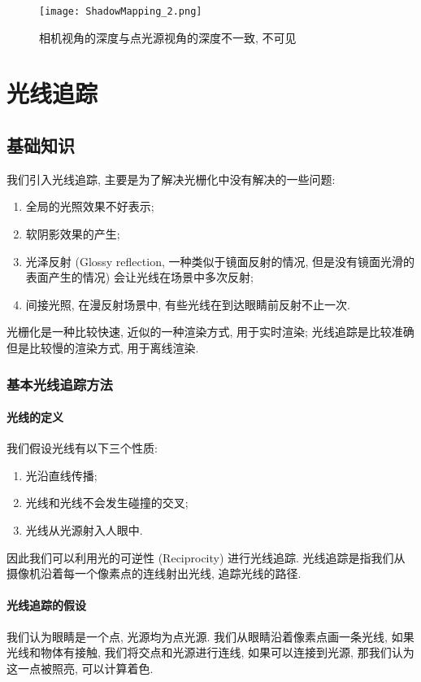 \begin{figure}[H]
	\centering
	\texttt{[image: ShadowMapping\_2.png]}
	\caption{相机视角的深度与点光源视角的深度不一致, 不可见}
	\label{fig:ShadowMapping_2}
\end{figure}

\chapter{光线追踪}

\section{基础知识}

我们引入光线追踪, 主要是为了解决光栅化中没有解决的一些问题: 
\begin{enumerate}
	\item 全局的光照效果不好表示; 
	\item 软阴影效果的产生; 
	\item 光泽反射 (Glossy reflection, 一种类似于镜面反射的情况, 但是没有镜面光滑的表面产生的情况) 会让光线在场景中多次反射; 
	\item 间接光照, 在漫反射场景中, 有些光线在到达眼睛前反射不止一次. 
\end{enumerate}

光栅化是一种比较快速, 近似的一种渲染方式, 用于实时渲染; 光线追踪是比较准确但是比较慢的渲染方式, 用于离线渲染. 

\subsection{基本光线追踪方法}

\subsubsection{光线的定义}

我们假设光线有以下三个性质: 
\begin{enumerate}
	\item 光沿直线传播; 
	\item 光线和光线不会发生碰撞的交叉; 
	\item 光线从光源射入人眼中. 
\end{enumerate}
因此我们可以利用光的可逆性 (Reciprocity) 进行光线追踪. 光线追踪是指我们从摄像机沿着每一个像素点的连线射出光线, 追踪光线的路径. 

\subsubsection{光线追踪的假设}
我们认为眼睛是一个点, 光源均为点光源. 我们从眼睛沿着像素点画一条光线, 如果光线和物体有接触, 我们将交点和光源进行连线, 如果可以连接到光源, 那我们认为这一点被照亮, 可以计算着色. 

